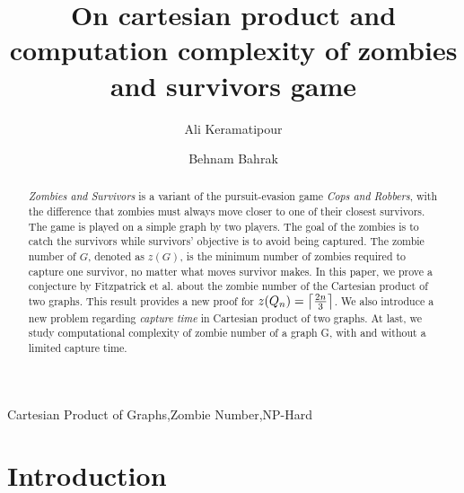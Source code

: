 \documentclass[1p]{elsarticle}
\DeclarePairedDelimiter\ceil{\lceil}{\rceil} \DeclarePairedDelimiter\floor{\lfloor}{\rfloor}
\begin{document}
	
	\begin{frontmatter}
		
		\title{On cartesian product and computation complexity of zombies and survivors game}
		
		
		\author{Ali Keramatipour}
		
		\author{Behnam Bahrak}
		
		\address{School of Electrical and Computer Engineering, College of Engineering, University of Tehran, Tehran, Iran}
		
		\begin{abstract}
		{\it Zombies and Survivors} is a variant of the pursuit-evasion game {\it Cops and Robbers}, with the difference
		that zombies must always move closer to one of their closest survivors. The game is played on a simple graph by
		two players. The goal of the zombies is to catch the survivors while survivors' objective is to avoid being
		captured. The zombie number of $G$, denoted as $z(G)$, is the minimum number of zombies required to capture one
		survivor, no matter what moves survivor makes. In this paper, we prove a conjecture by Fitzpatrick et
		al.\cite{Fitz16} about the zombie number of the Cartesian product of two graphs.  This result provides a new
		proof for $z(Q_n) = \ceil*{\frac{2n}{3}}$. We also introduce a new problem regarding {\it capture time} in
		Cartesian product of two graphs. At last, we study computational complexity of zombie number of a graph G, with
		and without a limited capture time.
		\end{abstract}
		
		\begin{keyword}
			Cartesian Product of Graphs\sep Zombie Number\sep NP-Hard
		\end{keyword}
		
	\end{frontmatter}
	
\section{Introduction}\label{section-introduction}
\end{document}
